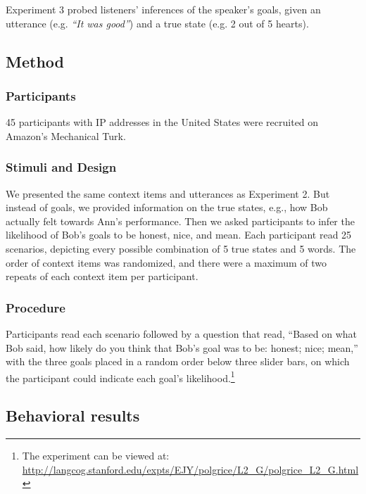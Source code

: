 \documentclass[10pt,letterpaper]{article}
\begin{document}
Experiment 3 probed listeners' inferences of the speaker's goals, given an utterance (e.g. \emph{``It was good''}) and a true state (e.g. 2 out of 5 hearts).

\subsection{Method}

\subsubsection{Participants}

45 participants with IP addresses in the United States were recruited on Amazon's Mechanical Turk.


\subsubsection{Stimuli and Design}

We presented the same context items and utterances as Experiment 2.
But instead of goals, we provided information on the true states, e.g., how Bob actually felt towards Ann's performance.
Then we asked participants to infer the likelihood of Bob's goals to be honest, nice, and mean.
Each participant read 25 scenarios, depicting every possible combination of 5 true states and 5 words.
The order of context items was randomized, and there were a maximum of two repeats of each context item per participant.

\subsubsection{Procedure}
Participants read each scenario followed by a question that read, ``Based on what Bob said, how likely do you think that Bob's goal was to be: honest; nice; mean,'' with the three goals placed in a random order below three slider bars, on which the participant could indicate each goal's likelihood.\footnote{The experiment can be viewed at: \url{http://langcog.stanford.edu/expts/EJY/polgrice/L2_G/polgrice_L2_G.html}}



\subsection{Behavioral results}
\end{document}
